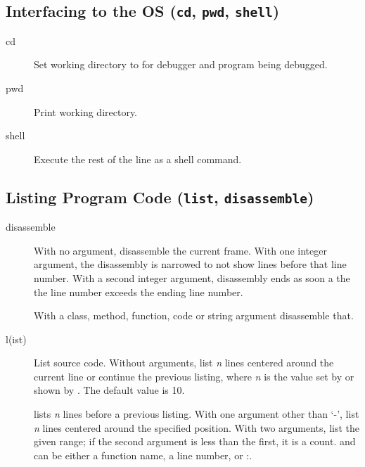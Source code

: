 \subsection{Interfacing to the OS ({\tt cd}, {\tt pwd},
  {\tt shell})\label{subsection-os}}

\begin{description}

\item[cd ]\label{command:cd}

Set working directory to  for debugger and program
being debugged.

\item[pwd]\label{command:pwd}

Print working directory.  

\item[shell ]\label{command:shell}

Execute the rest of the line as a shell command.

\end{description}

\subsection{Listing Program Code ({\tt list}, {\tt disassemble})\label{subsection-listing}}

\begin{description}

\item[disassemble  ]

With no argument, disassemble the current frame.  With one integer
argument, the disassembly is narrowed to not show lines before that
line number. With a second integer argument, disassembly ends as soon
a the the line number exceeds the ending line number.

With a class, method, function, code or string argument disassemble
that.

\item[l(ist) ]\label{command:list}

List source code.  Without arguments, list
\emph{n} lines centered around the current line or continue the previous
listing, where \emph{n} is the value set by  or
shown by .  The default value is 10.

 lists \emph{n} lines before a previous listing. With one
argument other than `-', list \emph{n} lines centered around the
specified position.  With two arguments, list the given range; if the
second argument is less than the first, it is a count.  and
 can be either a function name, a line number, or
:.

\end{description}

